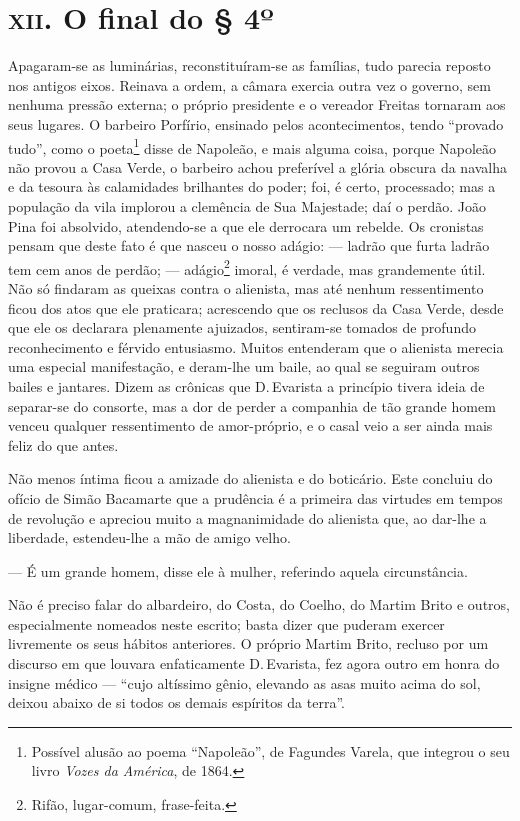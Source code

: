 \section*{\textsc{xii}. O final do § 4º }

Apagaram-se as luminárias, reconstituíram-se as famílias, tudo parecia
reposto nos antigos eixos. Reinava a ordem, a câmara exercia outra vez o
governo, sem nenhuma pressão externa; o próprio presidente e o vereador
Freitas tornaram aos seus lugares. O barbeiro Porfírio, ensinado pelos
acontecimentos, tendo ``provado tudo'', como o poeta\footnote{Possível
  alusão ao poema ``Napoleão'', de Fagundes Varela, que integrou o seu
  livro \emph{Vozes da América}, de 1864.} disse de Napoleão, e mais
alguma coisa, porque Napoleão não provou a Casa Verde, o barbeiro achou
preferível a glória obscura da navalha e da tesoura às calamidades
brilhantes do poder; foi, é certo, processado; mas a população da vila
implorou a clemência de Sua Majestade; daí o perdão. João Pina foi
absolvido, atendendo-se a que ele derrocara um rebelde. Os cronistas
pensam que deste fato é que nasceu o nosso adágio: --- ladrão que furta
ladrão tem cem anos de perdão; --- adágio\footnote{Rifão, lugar-comum,
  frase-feita.} imoral, é verdade, mas grandemente útil. Não só findaram
as queixas contra o alienista, mas até nenhum ressentimento ficou dos
atos que ele praticara; acrescendo que os reclusos da Casa Verde, desde
que ele os declarara plenamente ajuizados, sentiram-se tomados de
profundo reconhecimento e férvido entusiasmo. Muitos entenderam que o
alienista merecia uma especial manifestação, e deram-lhe um baile, ao
qual se seguiram outros bailes e jantares. Dizem as crônicas que D.\,Evarista a princípio tivera ideia de separar-se do consorte, mas a dor
de perder a companhia de tão grande homem venceu qualquer ressentimento
de amor-próprio, e o casal veio a ser ainda mais feliz do que antes.

Não menos íntima ficou a amizade do alienista e do boticário. Este
concluiu do ofício de Simão Bacamarte que a prudência é a primeira das
virtudes em tempos de revolução e apreciou muito a magnanimidade do
alienista que, ao dar-lhe a liberdade, estendeu-lhe a mão de amigo
velho.

--- É um grande homem, disse ele à mulher, referindo aquela
circunstância.

Não é preciso falar do albardeiro, do Costa, do Coelho, do Martim Brito
e outros, especialmente nomeados neste escrito; basta dizer que puderam
exercer livremente os seus hábitos anteriores. O próprio Martim Brito,
recluso por um discurso em que louvara enfaticamente D.\,Evarista, fez
agora outro em honra do insigne médico --- ``cujo altíssimo gênio,
elevando as asas muito acima do sol, deixou abaixo de si todos os demais
espíritos da terra''.

